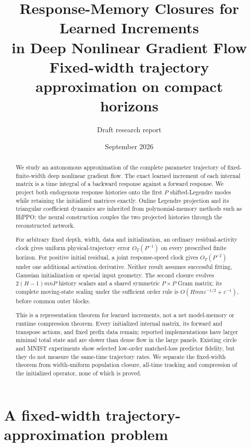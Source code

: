 \documentclass[11pt]{article}
\title{Response-Memory Closures for Learned Increments\\
in Deep Nonlinear Gradient Flow\\
\large Fixed-width trajectory approximation on compact horizons}
\author{Draft research report}
\date{September 2026}
\theoremstyle{definition}
\theoremstyle{remark}
\begin{document}
\maketitle

\begin{abstract}
We study an autonomous approximation of the complete parameter trajectory of
fixed-finite-width deep nonlinear gradient flow.  The exact learned increment of
each internal matrix is a time integral of a backward response against a forward
response.  We project both endogenous response histories onto the first $P$
shifted-Legendre modes while retaining the initialized matrices exactly.  Online
Legendre projection and its triangular coefficient dynamics are inherited from
polynomial-memory methods such as HiPPO; the neural construction couples the two
projected histories through the reconstructed network.

For arbitrary fixed depth, width, data and initialization, an
ordinary residual-activity clock gives uniform physical-trajectory error
$O_T(P^{-1})$ on every prescribed finite horizon.  For positive initial
residual, a joint response-speed clock gives $O_T(P^{-2})$ under one additional
activation derivative.  Neither result assumes successful fitting, Gaussian
initialization or special input geometry.
The second closure evolves $2(H-1)mnP$ history scalars and a shared symmetric
$P\times P$ Gram matrix; its complete moving-state scaling under the sufficient
order rule is
$O(Hmn\varepsilon^{-1/2}+\varepsilon^{-1})$, before common outer blocks.

This is a representation theorem for learned increments, not a net model-memory
or runtime compression theorem.  Every initialized internal matrix, its forward
and transpose actions, and fixed prefix data remain; reported implementations
have larger minimal total state and are slower than dense flow in the large
panels.  Existing circle and MNIST experiments show selected low-order
matched-loss predictor fidelity, but they do not measure the same-time trajectory
rates.  We separate the fixed-width theorem from width-uniform population
closure, all-time tracking and compression of the initialized operator, none of
which is proved.
\end{abstract}

\section{A fixed-width trajectory-approximation problem}
\end{document}
